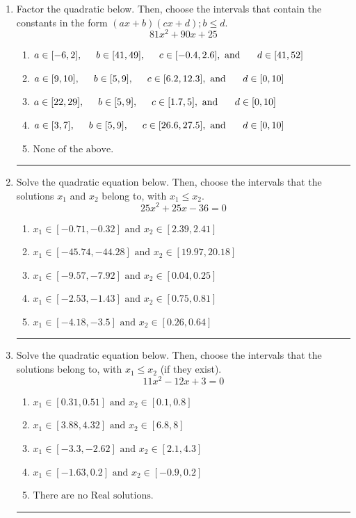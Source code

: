 \documentclass[14pt]{extbook}
\newcommand{\litem}[1]{\item#1\hspace*{-1cm}\rule{\textwidth}{0.4pt}}
\begin{document}
\begin{enumerate}
{\begin{enumerate}[label=\Alph*.]
\end{enumerate} }
\litem{
Factor the quadratic below. Then, choose the intervals that contain the constants in the form $(ax+b)(cx+d); b \leq d.$\[ 81x^{2} +90 x + 25 \]\begin{enumerate}[label=\Alph*.]
\item \( a \in [-6, 2], \hspace*{5mm} b \in [41, 49], \hspace*{5mm} c \in [-0.4, 2.6], \text{ and } \hspace*{5mm} d \in [41, 52] \)
\item \( a \in [9, 10], \hspace*{5mm} b \in [5, 9], \hspace*{5mm} c \in [6.2, 12.3], \text{ and } \hspace*{5mm} d \in [0, 10] \)
\item \( a \in [22, 29], \hspace*{5mm} b \in [5, 9], \hspace*{5mm} c \in [1.7, 5], \text{ and } \hspace*{5mm} d \in [0, 10] \)
\item \( a \in [3, 7], \hspace*{5mm} b \in [5, 9], \hspace*{5mm} c \in [26.6, 27.5], \text{ and } \hspace*{5mm} d \in [0, 10] \)
\item \( \text{None of the above.} \)

\end{enumerate} }
\litem{
Solve the quadratic equation below. Then, choose the intervals that the solutions $x_1$ and $x_2$ belong to, with $x_1 \leq x_2$.\[ 25x^{2} +25 x -36 = 0 \]\begin{enumerate}[label=\Alph*.]
\item \( x_1 \in [-0.71, -0.32] \text{ and } x_2 \in [2.39, 2.41] \)
\item \( x_1 \in [-45.74, -44.28] \text{ and } x_2 \in [19.97, 20.18] \)
\item \( x_1 \in [-9.57, -7.92] \text{ and } x_2 \in [0.04, 0.25] \)
\item \( x_1 \in [-2.53, -1.43] \text{ and } x_2 \in [0.75, 0.81] \)
\item \( x_1 \in [-4.18, -3.5] \text{ and } x_2 \in [0.26, 0.64] \)

\end{enumerate} }
\litem{
Solve the quadratic equation below. Then, choose the intervals that the solutions belong to, with $x_1 \leq x_2$ (if they exist).\[ 11x^{2} -12 x + 3 = 0 \]\begin{enumerate}[label=\Alph*.]
\item \( x_1 \in [0.31, 0.51] \text{ and } x_2 \in [0.1, 0.8] \)
\item \( x_1 \in [3.88, 4.32] \text{ and } x_2 \in [6.8, 8] \)
\item \( x_1 \in [-3.3, -2.62] \text{ and } x_2 \in [2.1, 4.3] \)
\item \( x_1 \in [-1.63, 0.2] \text{ and } x_2 \in [-0.9, 0.2] \)
\item \( \text{There are no Real solutions.} \)


\end{enumerate}}
\end{enumerate}
\end{document}
